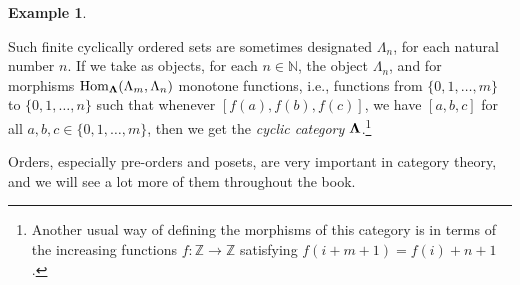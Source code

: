 \documentclass[11pt]{book}
\theoremstyle{definition}
\newtheorem{example}{Example}[section]
\theoremstyle{definition}
\theoremstyle{definition}
\theoremstyle{theorem}
\theoremstyle{definition}
\begin{document}
\begin{example}
\begin{center}
	\end{center} 
	Such finite cyclically ordered sets are sometimes designated $\Lambda_n$, for each natural number $n$. If we take as objects, for each $n \in \mathbb{N}$, the object $\Lambda_n$, and for morphisms $\text{Hom}_{\bf{\Lambda}}(\Lambda_m, \Lambda_n)$ monotone functions, i.e., functions from $\{0,1,\dots, m\}$ to $\{0,1,\dots, n\}$ such that whenever $[f(a), f(b), f(c)]$, we have $[a,b,c]$ for all $a,b,c \in \{0,1,\dots, m\}$, then we get the \textit{cyclic category}  $\bf{\Lambda}$.\footnote{Another usual way of defining the morphisms of this category is in terms of the increasing functions $f: \mathbb{Z} \rightarrow \mathbb{Z}$ satisfying $f(i + m + 1) = f(i) + n + 1$.} \par 
	Orders, especially pre-orders and posets, are very important in category theory, and we will see a lot more of them throughout the book. 
\end{example}
\end{document}
